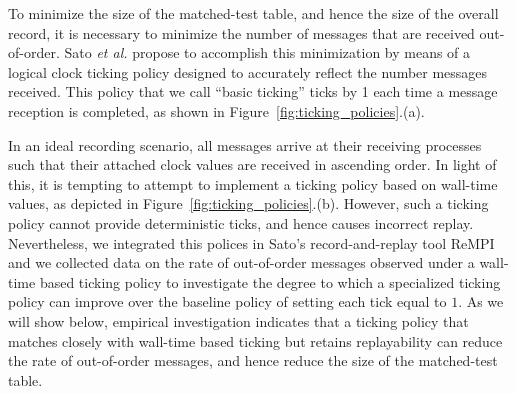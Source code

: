 To minimize the size of the matched-test table, and hence the size of
the overall record, it is necessary to minimize the number of messages
that are received out-of-order. Sato \textit{et al.} propose to
accomplish this minimization by means of a logical clock ticking
policy designed to accurately reflect the number messages
received. This policy that we call ``basic ticking'' ticks by 1 each
time a message reception is completed, as shown in
Figure~\ref{fig:ticking_policies}.(a).

In an ideal recording scenario, all messages arrive at their receiving
processes such that their attached clock values are received in
ascending order. In light of this, it is tempting to attempt to
implement a ticking policy based on wall-time values, as depicted in
Figure~\ref{fig:ticking_policies}.(b). However, such a ticking policy
cannot provide deterministic ticks, and hence causes incorrect
replay. Nevertheless, we integrated this polices in Sato's
record-and-replay tool ReMPI and we collected data on the rate of
out-of-order messages observed under a wall-time based ticking policy
to investigate the degree to which a specialized ticking policy can
improve over the baseline policy of setting each tick equal to $1$. As
we will show below, empirical investigation indicates that a ticking
policy that matches closely with wall-time based ticking but retains
replayability can reduce the rate of out-of-order messages, and hence
reduce the size of the matched-test table.

